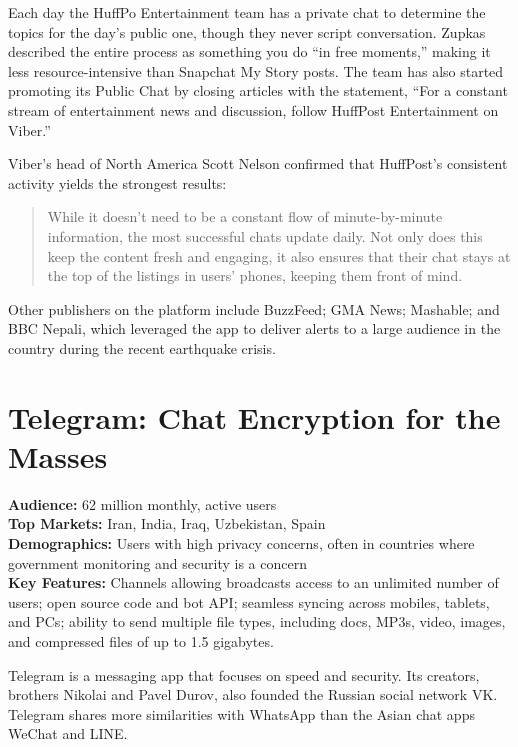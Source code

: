 \documentclass[notoc, symmetric, nobib, nols]{towcenter-guideto-book}
\begin{document}
Each day the HuffPo Entertainment team has a private chat to determine the topics for the day's public one, though they never script conversation. Zupkas described the entire process as something you do ``in free moments,'' making it less resource-intensive than Snapchat My Story posts. The team has also started promoting its Public Chat by closing articles with the statement, ``For a constant stream of entertainment news and discussion, follow HuffPost Entertainment on Viber.''  

Viber's head of North America Scott Nelson confirmed that HuffPost's consistent activity yields the strongest results: 

\begin{quote}
While it doesn't need to be a constant flow of minute-by-minute information, the most successful chats update daily. Not only does this keep the content fresh and engaging, it also ensures that their chat stays at the top of the listings in users' phones, keeping them front of mind.
\end{quote}

Other publishers on the platform include BuzzFeed; GMA News; Mashable; and BBC Nepali, which leveraged the app to deliver alerts to a large audience in the country during the recent earthquake crisis. 

\section{Telegram: Chat Encryption for the Masses}

\begin{framed}
\noindent\textbf{Audience:} 62 million monthly, active users\\
\noindent\textbf{Top Markets:} Iran, India, Iraq, Uzbekistan, Spain\\
\noindent\textbf{Demographics:} Users with high privacy concerns, often in countries where government monitoring and security is a concern\\
\noindent\textbf{Key Features:} Channels allowing broadcasts access to an unlimited number of users; open source code and bot API; seamless syncing across mobiles, tablets, and PCs; ability to send multiple file types, including docs, MP3s, video, images, and compressed files of up to 1.5 gigabytes.
\end{framed}
\vspace{\baselineskip}
Telegram is a messaging app that focuses on speed and security. Its creators, brothers Nikolai and Pavel Durov, also founded the Russian social network VK. Telegram shares more similarities with WhatsApp than the Asian chat apps WeChat and LINE. 
\end{document}
